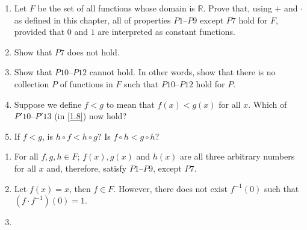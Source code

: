 \begin{pr} \label{3.28}
  \begin{enumerate}[label = (\alph*)]
    \item Let $F$ be the set of all functions whose domain is $\mathbb{R}$. Prove
    that, using $+$ and $\cdot$ as defined in this chapter, all of properties
    $P1$--$P9$ except $P7$ hold for $F$, provided that $0$ and $1$ are interpreted
    as constant functions.
    \item Show that $P7$ does not hold.
    \item Show that $P10$--$P12$ cannot hold. In other words, show that there is no
    collection $P$ of functions in $F$ such that $P10$--$P12$ hold for $P$.
    \item Suppose we define $f < g$ to mean that $f(x) < g(x)$ for all $x$. Which of
    $P'10$--$P'13$ (in \ref{1.8}) now hold?
    \item If $f < g$, is $h \circ f < h \circ g$? Is $f \circ h < g \circ h$?
  \end{enumerate}
\end{pr}

\begin{solution}
  \begin{enumerate}[label = (\alph*)]
    \item For all $f, g, h \in F$; $f(x),g(x)$ and $h(x)$ are all three arbitrary
    numbers for all $x$ and, therefore, satisfy $P1$--$P9$, except $P7$.
    \item Let $f(x) = x$, then $f \in F$. However, there does not exist
    $f^{-1}(0)$ such that $(f \cdot f^{-1})(0) = 1$.
    \item
  \end{enumerate}
\end{solution}
